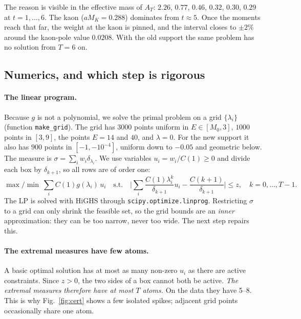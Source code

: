 \documentclass[11pt]{article}
\theoremstyle{remark}
\begin{document}
The reason is visible in the effective mass of $A_T$: $2.26$, $0.77$, $0.46$, $0.32$, $0.30$, $0.29$ at $t=1,\dots,6$. The kaon ($aM_K=0.288$) dominates from $t\approx5$.
Once the moments reach that far, the weight at the kaon is pinned, and the interval closes to $\pm2\%$ around the kaon-pole value $0.0208$.
With the old support the same problem has no solution from $T=6$ on.

\subsection{Numerics, and which step is rigorous}\label{sec:numerics}
\paragraph{The linear program.} Because $g$ is not a polynomial, we solve the primal problem on a grid $\{\lambda_i\}$ (function \texttt{make\_grid}). The grid has $3000$ points uniform in $E\in[M_0,3]$,
$1000$ points in $[3,9]$, the points $E=14$ and $40$, and $\lambda=0$. For the new support it also has $900$ points in $[-1,-10^{-4}]$, uniform down to $-0.05$ and geometric below.
The measure is $\sigma=\sum_iw_i\delta_{\lambda_i}$. We use variables $u_i=w_i/C(1)\ge0$ and divide each box by $\delta_{k+1}$, so all rows are of order one:
\begin{equation}
 \max/\min\ \sum_iC(1)g(\lambda_i)\,u_i\quad\text{s.t.}\quad \Big|\sum_i\frac{C(1)\lambda_i^k}{\delta_{k+1}}u_i-\frac{C(k+1)}{\delta_{k+1}}\Big|\le z,\quad k=0,\dots,T-1.
\end{equation}
The LP is solved with HiGHS through \texttt{scipy.optimize.linprog}. Restricting $\sigma$ to a grid can only shrink the feasible set, so the grid bounds are an \emph{inner} approximation:
they can be too narrow, never too wide. The next step repairs this.

\paragraph{The extremal measures have few atoms.} A basic optimal solution has at most as many non-zero $u_i$ as there are active constraints. Since $z>0$, the two sides of a box cannot both be active.
\emph{The extremal measures therefore have at most $T$ atoms.} On the data they have 5--8. This is why Fig.~\ref{fig:cert} shows a few isolated spikes; adjacent grid points occasionally share one atom.
\end{document}
